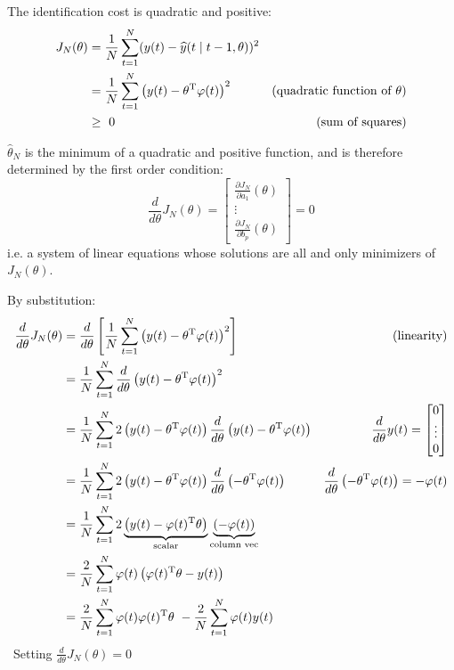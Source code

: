 The identification cost is quadratic and positive:		
\begin{align*}
J_{N}(\theta) & =\frac{1}{N}\sum _{t=1}^{N}(y(t) -\widehat{y}(t\mid t-1,\theta))^{2} & \\
 & =\frac{1}{N}\sum _{t=1}^{N}\left(y(t) -\theta ^{\mathrm{T}} \varphi (t)\right)^{2} & (\text{quadratic function of} \ \theta) \\
 & \geq \ 0 & \text{(sum of squares)}
\end{align*}


$ \hat{\theta }_{N}$ is the minimum of a quadratic and positive function, and is therefore determined by the first order condition:
\begin{equation*}
\frac{d}{d\theta } J_{N}(\theta) =\begin{bmatrix}
\frac{\partial J_{N}}{\partial a_{1}}(\theta)\\
\vdots \\
\frac{\partial J_{N}}{\partial b_{p}}(\theta)
\end{bmatrix} =0
\end{equation*}
i.e. a system of linear equations whose solutions are all and only minimizers of $ J_{N}(\theta)$.

By substitution:
\begin{align*}
\frac{d}{d\theta } J_{N}(\theta) & =\frac{d}{d\theta }\left[\frac{1}{N}\sum _{t=1}^{N}\left(y(t) -\theta ^{\mathrm{T}} \varphi (t)\right)^{2}\right] & \text{(linearity)}\\
 & =\frac{1}{N}\sum _{t=1}^{N}\frac{d}{d\theta }\left(y(t) -\theta ^{\mathrm{T}} \varphi (t)\right)^{2} & \\
 & =\frac{1}{N}\sum _{t=1}^{N} 2\left(y(t) -\theta ^{\mathrm{T}} \varphi (t)\right)\frac{d}{d\theta }\left(y(t) -\theta ^{\mathrm{T}} \varphi (t)\right) & \frac{d}{d\theta } y(t) =\begin{bmatrix}
0\\
\vdots \\
0
\end{bmatrix}\\
 & =\frac{1}{N}\sum _{t=1}^{N} 2\left(y(t) -\theta ^{\mathrm{T}} \varphi (t)\right)\frac{d}{d\theta }\left(-\theta ^{\mathrm{T}} \varphi (t)\right) & \frac{d}{d\theta }\left(-\theta ^{\mathrm{T}} \varphi (t)\right) =-\varphi (t)\\
 & =\frac{1}{N}\sum _{t=1}^{N} 2\underbrace{\left(y(t) -\varphi (t)^{\mathrm{T}} \theta \right)}_{\text{scalar}}\underbrace{(-\varphi (t))}_{\text{column vec}} & \\
 & =\frac{2}{N}\sum _{t=1}^{N} \varphi (t)\left(\varphi (t)^{\mathrm{T}} \theta -y(t)\right) & \\
 & =\frac{2}{N}\sum _{t=1}^{N} \varphi (t) \varphi (t)^{\mathrm{T}} \theta \ -\frac{2}{N}\sum _{t=1}^{N} \varphi (t) y(t) & 
\end{align*} \ 
Setting $ \frac{d}{d\theta } J_{N}(\theta) =0$	


